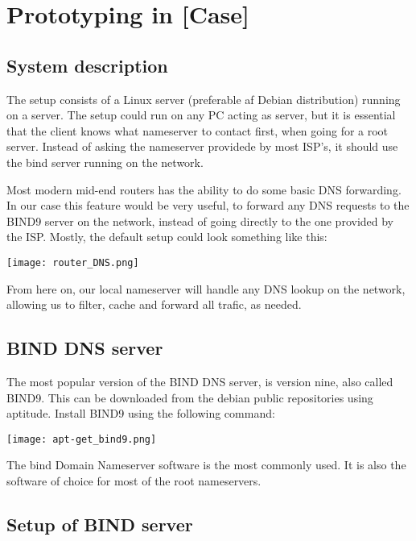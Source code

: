 \chapter{Prototyping in [Case]}

\section{System description}
The setup consists of a Linux server (preferable af Debian distribution) running on a server. The setup could run on any PC acting as server, but it is essential that the client knows what nameserver to contact first, when going for a root server. Instead of asking the nameserver providede by most ISP's, it should use the bind server running on the network.

Most modern mid-end routers has the ability to do some basic DNS forwarding. In our case this feature would be very useful, to forward any DNS requests to the BIND9 server on the network, instead of going directly to the one provided by the ISP. Mostly, the default setup could look something like this:

\begin{center}
	\texttt{[image: router\_DNS.png]}
\end{center}

From here on, our local nameserver will handle any DNS lookup on the network, allowing us to filter, cache and forward all trafic, as needed.

\section{BIND DNS server}
The most popular version of the BIND DNS server, is version nine, also called BIND9. This can be downloaded from the debian public repositories using aptitude. Install BIND9 using the following command:

\begin{center}
	\texttt{[image: apt-get\_bind9.png]}
\end{center}

The bind Domain Nameserver software is the most commonly used. It is also the software of choice for most of the root nameservers.

\section{Setup of BIND server}



